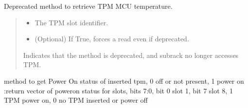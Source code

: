 \documentclass[letterpaper,10pt,english]{sphinxmanual}
\begin{document}
\begin{fulllineitems}
\begin{fulllineitems}
\begin{quote}
\begin{description}
\end{description}\end{quote}

\end{fulllineitems}


\begin{fulllineitems}
\label{\detokenize{apidocs:subrack_management_board.SubrackMngBoard.GetTPMMCUTemperature}}
\pysigstartsignatures
{}
\pysigstopsignatures
\sphinxAtStartPar
Deprecated method to retrieve TPM MCU temperature.
\begin{quote}\begin{description}
\begin{itemize}
\item {} 
\sphinxAtStartPar
{} \textendash{} The TPM slot identifier.

\item {} 
\sphinxAtStartPar
{} \textendash{} (Optional) If True, forces a read even if deprecated.

\end{itemize}

\sphinxAtStartPar
{\hyperref[\detokenize{apidocs:subrack_management_board.SubrackExecFault}]{}} \textendash{} Indicates that the method is deprecated, and
subrack no longer accesses TPM.

\end{description}\end{quote}

\end{fulllineitems}


\begin{fulllineitems}
\label{\detokenize{apidocs:subrack_management_board.SubrackMngBoard.GetTPMOnOffVect}}
\pysigstartsignatures
{}
\pysigstopsignatures
\sphinxAtStartPar
method to get Power On status of inserted tpm, 0 off or not present, 1 power on
:return vector of poweron status for slots, bits 7:0, bit 0 slot 1, bit 7 slot 8, 1 TPM power on, 0 no TPM
inserted or power off


\end{fulllineitems}
\end{fulllineitems}
\end{document}

